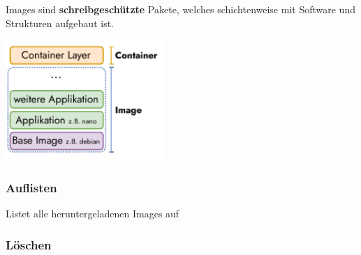 \documentclass[
  10pt,
  a4paper,
]{article}
\newenvironment{Shaded}{}{}
\newcommand{\ExtensionTok}[1]{\textcolor[rgb]{0.84,0.23,0.29}{\textbf{#1}}}
\newcommand{\NormalTok}[1]{\textcolor[rgb]{0.14,0.16,0.18}{#1}}
\newcommand{\OperatorTok}[1]{\textcolor[rgb]{0.14,0.16,0.18}{#1}}
\begin{document}
\begin{multicols*}{2}
Images sind \textbf{schreibgeschützte} Pakete, welches schichtenweise
mit Software und Strukturen aufgebaut ist.

\begin{center}
\includegraphics[width=6cm,height=\textheight]{images/docker/image_structure.pdf}
\end{center}

\subsubsection{\texorpdfstring{{\small \faTerminal\hspace{1mm}}
Auflisten}{ Auflisten}}\label{auflisten}

Listet alle heruntergeladenen Images auf

\begin{Shaded}
\end{Shaded}

\subsubsection{\texorpdfstring{{\small \faTerminal\hspace{1mm}}
Löschen}{ Löschen}}\label{luxf6schen}

\begin{Shaded}
\end{Shaded}


\end{multicols*}
\end{document}
